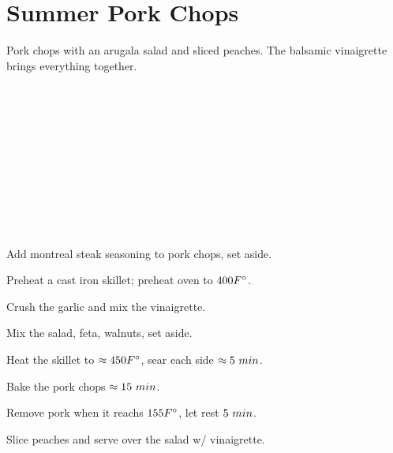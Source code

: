 \section{Summer Pork Chops}

\begin{recipestats}[
        servings=2,
        preptime=15 \minute,
        bakingtime=25 \minute,
        source=Mike \& Jane,
        original=\citeauthor{realSimpleSummerPorkchops}~\cite{realSimpleSummerPorkchops},
    ]
\end{recipestats}

\begin{recipeabstract}
    Pork chops with an arugala salad and sliced peaches.
    The balsamic vinaigrette brings everything together.
\end{recipeabstract}

\begin{ingredientcolumns}
    \begin{ingredientblock}[vinaigrette]
        \\
        \\
        \\
        \\
        \\
    \end{ingredientblock}

    \begin{ingredientblock}
        \\
        \\
        \\
        \\
    \end{ingredientblock}
\end{ingredientcolumns}

\begin{preparation}
\item Add montreal steak seasoning to pork chops, set aside.
\item Preheat a cast iron skillet; preheat oven to $400 \Fahrenheit$.
\item Crush the garlic and mix the vinaigrette.
\item Mix the salad, feta, walnuts, set aside.
\item Heat the skillet to $\approx 450 \Fahrenheit$, sear each side $\approx 5~\minute$.
\item Bake the pork chops $\approx 15~\minute$.
\item Remove pork when it reachs $155 \Fahrenheit$, let rest $5~\minute$.
\item Slice peaches and serve over the salad w/ vinaigrette.
\end{preparation}

\recipeend%
